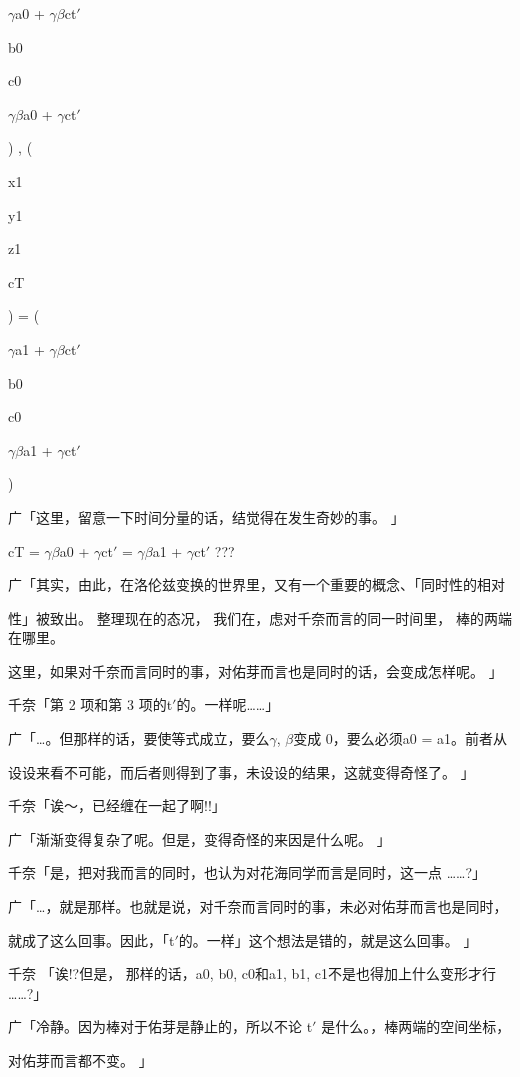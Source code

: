 $\gamma$a0 + $\gamma$$\beta$ct$\prime$\par
b0\par
c0\par
$\gamma$$\beta$a0 + $\gamma$ct$\prime$\par
) , (\par
x1\par
y1\par
z1\par
cT\par
) = (\par
$\gamma$a1 + $\gamma$$\beta$ct$\prime$\par
b0\par
c0\par
$\gamma$$\beta$a1 + $\gamma$ct$\prime$\par
)\par
广「这里，留意一下时间分量的话，结觉得在发生奇妙的事。 」\par
cT = $\gamma$$\beta$a0 + $\gamma$ct$\prime$ = $\gamma$$\beta$a1 + $\gamma$ct$\prime$   ???\par
广「其实，由此，在洛伦兹变换的世界里，又有一个重要的概念、「同时性的相对\par
性」被致出。 整理现在的态况， 我们在，虑对千奈而言的同一时间里， 棒的两端在哪里。\par
这里，如果对千奈而言同时的事，对佑芽而言也是同时的话，会变成怎样呢。 」\par
千奈「第 2 项和第 3 项的t$\prime$的。一样呢……」\par
广「…。但那样的话，要使等式成立，要么$\gamma$, $\beta$变成 0，要么必须a0 = a1。前者从\par
设设来看不可能，而后者则得到了事，未设设的结果，这就变得奇怪了。 」\par
千奈「诶～，已经缠在一起了啊!!」\par
广「渐渐变得复杂了呢。但是，变得奇怪的来因是什么呢。 」\par
千奈「是，把对我而言的同时，也认为对花海同学而言是同时，这一点 ……?」\par
广「…，就是那样。也就是说，对千奈而言同时的事，未必对佑芽而言也是同时，\par
就成了这么回事。因此，「t$\prime$的。一样」这个想法是错的，就是这么回事。 」\par
千奈 「诶!?但是， 那样的话，a0, b0, c0和a1, b1, c1不是也得加上什么变形才行 ……?」\par
广「冷静。因为棒对于佑芽是静止的，所以不论 t$\prime$ 是什么。，棒两端的空间坐标，\par
对佑芽而言都不变。 」\par

